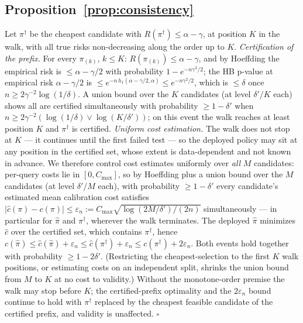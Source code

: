 \documentclass[sigconf,nonacm]{acmart}
\newcommand{\eps}{\varepsilon}
\begin{document}
\subsection{Proposition~\ref{prop:consistency}}
Let $\pi^\dagger$ be the cheapest candidate with $R(\pi^\dagger) \le
\alpha - \gamma$, at position $K$ in the walk, with all true risks
non-decreasing along the order up to $K$.
\emph{Certification of the prefix.} For every $\pi_{(k)}$, $k \le
K$: $R(\pi_{(k)}) \le \alpha - \gamma$, and by Hoeffding the empirical
risk is $\le \alpha - \gamma/2$ with probability
$1 - e^{-n\gamma^2/2}$; the HB p-value at empirical risk
$\alpha - \gamma/2$ is $\le e^{-n\,h_1(\alpha-\gamma/2,\alpha)} \le
e^{-n\gamma^2/2}$, which is $\le \delta$ once
$n \ge 2\gamma^{-2}\log(1/\delta)$. A union bound over the $K$ candidates
(at level $\delta'/K$ each) shows all are certified simultaneously with
probability $\ge 1 - \delta'$ when
$n \ge 2\gamma^{-2}(\log(1/\delta) \vee \log(K/\delta'))$; on this event
the walk reaches at least position $K$ and $\pi^\dagger$ is certified.
\emph{Uniform cost estimation.} The walk does not stop at $K$ --- it
continues until the first failed test --- so the deployed policy may
sit at any position in the certified set, whose extent is
data-dependent and not known in advance. We therefore control cost
estimates uniformly over \emph{all} $M$ candidates: per-query costs
lie in $[0, C_{\max}]$,
so by Hoeffding plus a union bound over the $M$ candidates (at level
$\delta'/M$ each), with
probability $\ge 1 - \delta'$ every candidate's estimated mean
calibration cost satisfies $|\hat c(\pi) - c(\pi)| \le \eps_n :=
C_{\max}\sqrt{\log(2M/\delta')/(2n)}$ simultaneously --- in particular
for $\hat\pi$ and $\pi^\dagger$, wherever the walk terminates. The
deployed
$\hat\pi$ minimizes $\hat c$ over the certified set, which contains
$\pi^\dagger$, hence $c(\hat\pi) \le \hat c(\hat\pi) + \eps_n \le
\hat c(\pi^\dagger) + \eps_n \le c(\pi^\dagger) + 2\eps_n$. Both events
hold together with probability $\ge 1 - 2\delta'$. (Restricting the
cheapest-selection to the first $K$ walk positions, or estimating
costs on an independent split, shrinks the union bound from $M$ to $K$
at no cost to validity.) Without the
monotone-order premise the walk may stop before $K$; the
certified-prefix optimality and the $2\eps_n$ bound continue to hold
with $\pi^\dagger$ replaced by the cheapest feasible candidate of the
certified prefix, and validity is unaffected.
\hfill$\square$
\end{document}

